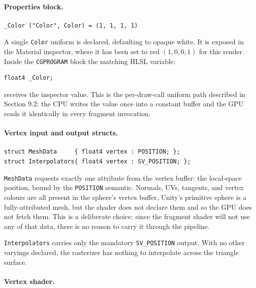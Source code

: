 \documentclass[11pt]{article}
\begin{document}
\paragraph{Properties block.}

\begin{lstlisting}
_Color ("Color", Color) = (1, 1, 1, 1)
\end{lstlisting}

A single \texttt{Color} uniform is declared, defaulting to opaque white. It is exposed in the Material inspector, where it has been set to red $(1, 0, 0, 1)$ for this render. Inside the \texttt{CGPROGRAM} block the matching HLSL variable:

\begin{lstlisting}
float4 _Color;
\end{lstlisting}

receives the inspector value. This is the per-draw-call uniform path described in Section 9.2: the CPU writes the value once into a constant buffer and the GPU reads it identically in every fragment invocation.

\paragraph{Vertex input and output structs.}

\begin{lstlisting}
struct MeshData     { float4 vertex : POSITION; };
struct Interpolators{ float4 vertex : SV_POSITION; };
\end{lstlisting}

\texttt{MeshData} requests exactly one attribute from the vertex buffer: the local-space position, bound by the \texttt{POSITION} semantic. Normals, UVs, tangents, and vertex colours are all present in the sphere's vertex buffer, Unity's primitive sphere is a fully-attributed mesh, but the shader does not declare them and so the GPU does not fetch them. This is a deliberate choice: since the fragment shader will not use any of that data, there is no reason to carry it through the pipeline.

\texttt{Interpolators} carries only the mandatory \texttt{SV\_POSITION} output. With no other varyings declared, the rasterizer has nothing to interpolate across the triangle surface.

\paragraph{Vertex shader.}
\end{document}
